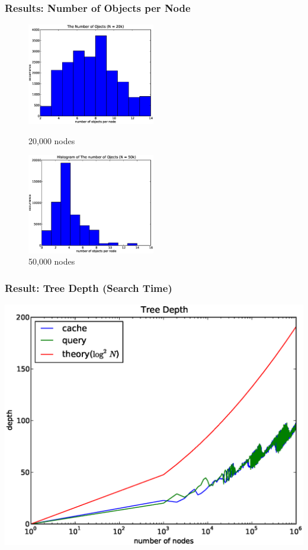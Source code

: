 \documentclass[red]{beamer}
\begin{document}
\begin{frame}
\frametitle{Results: Number of Objects per Node}
\begin{figure}
\begin{minipage}{5cm}
\centering
\includegraphics[width=2.2in]{figs/obj_node_20k.eps}
\caption{20,000 nodes} 
\end{minipage}
\begin{minipage}{5cm}
\centering
\includegraphics[width=2.2in]{figs/obj_node_50k.eps}
\caption{50,000 nodes}
\end{minipage}
\end{figure}
\end{frame}

\begin{frame}
\frametitle{Result: Tree Depth (Search Time)}
\begin{center}
\includegraphics[scale=0.3]{figs/depth.eps}
\end{center}
\end{frame}
\end{document}
